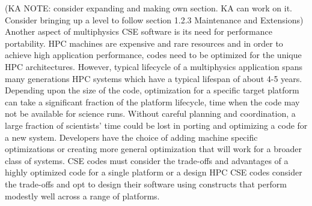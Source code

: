 (KA NOTE: consider expanding and making own section.  KA can work on it.  Consider bringing up a level to follow section 1.2.3 Maintenance and Extensions)
Another aspect of multiphysics CSE software is its need for
performance portability. HPC machines are expensive and rare resources and in order to achieve high application performance, codes need to be optimized for the unique HPC architectures.
 However, typical lifecycle of a
multiphysics application spans many generations HPC systems which have a typical lifespan of about 4-5 years.  Depending upon the size of the
code, optimization for a specific target platform can take a
significant fraction of the platform lifecycle, time when the code may not be available for science runs.  Without careful planning and coordination,  a
large fraction of scientists' time could be lost in porting and optimizing
a code for a new system.  Developers have the choice of adding machine specific optimizations or creating more general optimization that will work for a broader class of systems.  CSE codes must consider the trade-offs and advantages of a highly optimized code for a single platform or a design 
HPC CSE codes consider the trade-offs and opt to design their software
using constructs that perform modestly well across a range of
platforms. 



